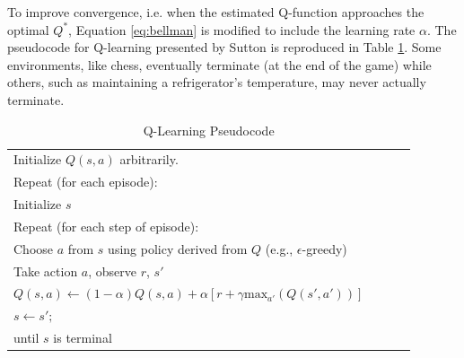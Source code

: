 To improve convergence, i.e. when the estimated Q-function approaches the optimal $Q^*$, Equation \ref{eq:bellman} is modified to include the learning rate $\alpha$. The pseudocode for Q-learning presented by Sutton is reproduced in Table \ref{tab:qlearning_pseudo}. Some environments, like chess, eventually terminate (at the end of the game) while others, such as maintaining a refrigerator's temperature, may never actually terminate.
\begin{table}[h]
	\caption{Q-Learning Pseudocode}  \label{tab:qlearning_pseudo}
	\begin{tabular}{|p{0.9\linewidth}|}\hline %
		Initialize $Q(s,a)$ arbitrarily. \\
		Repeat (for each episode): \\
		\qquad Initialize $s$\\
		\qquad Repeat (for each step of episode):\\
		\qquad \qquad Choose $a$ from $s$ using policy derived from $Q$ (e.g., $\epsilon$-greedy)\\
		\qquad \qquad Take action $a$, observe $r$, $s'$\\
		\qquad \qquad $Q(s,a)\gets (1-\alpha)Q(s,a) + \alpha [r + \gamma \text{max}_{a'}(Q(s',a'))]$\\
		\qquad \qquad $s \gets s';$\\
		\qquad until $s$ is terminal \\
		\hline
	\end{tabular}
\end{table}

